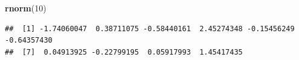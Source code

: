 \documentclass[
]{book}
\newenvironment{Shaded}{\begin{snugshade}}{\end{snugshade}}
\newcommand{\DecValTok}[1]{\textcolor[rgb]{0.00,0.00,0.81}{#1}}
\newcommand{\FunctionTok}[1]{\textcolor[rgb]{0.13,0.29,0.53}{\textbf{#1}}}
\newcommand{\NormalTok}[1]{#1}
\theoremstyle{definition}
\theoremstyle{definition}
\theoremstyle{definition}
\theoremstyle{definition}
\theoremstyle{remark}
\begin{document}
\begin{Shaded}
\begin{Highlighting}[]
\FunctionTok{rnorm}\NormalTok{(}\DecValTok{10}\NormalTok{)}
\end{Highlighting}
\end{Shaded}

\begin{verbatim}
##  [1] -1.74060047  0.38711075 -0.58440161  2.45274348 -0.15456249 -0.64357430
##  [7]  0.04913925 -0.22799195  0.05917993  1.45417435
\end{verbatim}

  
\end{document}
